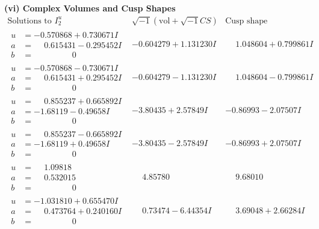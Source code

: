 \documentclass[1p]{elsarticle_modified}
\theoremstyle{definition}
\newcommand{\I}{\sqrt{-1}}
\begin{document}
\newpage\flushleft \textbf{(vi) Complex Volumes and Cusp Shapes}
$$\begin{array}{c|c|c}  
\text{Solutions to }I^u_{2}& \I (\text{vol} + \sqrt{-1}CS) & \text{Cusp shape}\\
 \hline 
\begin{aligned}
u &= -0.570868 + 0.730671 I \\
a &= \phantom{-}0.615431 - 0.295452 I \\
b &= \phantom{-0.000000 } 0\end{aligned}
 & -0.604279 + 1.131230 I & \phantom{-}1.048604 + 0.799861 I \\ \hline\begin{aligned}
u &= -0.570868 - 0.730671 I \\
a &= \phantom{-}0.615431 + 0.295452 I \\
b &= \phantom{-0.000000 } 0\end{aligned}
 & -0.604279 - 1.131230 I & \phantom{-}1.048604 - 0.799861 I \\ \hline\begin{aligned}
u &= \phantom{-}0.855237 + 0.665892 I \\
a &= -1.68119 - 0.49658 I \\
b &= \phantom{-0.000000 } 0\end{aligned}
 & -3.80435 + 2.57849 I & -0.86993 - 2.07507 I \\ \hline\begin{aligned}
u &= \phantom{-}0.855237 - 0.665892 I \\
a &= -1.68119 + 0.49658 I \\
b &= \phantom{-0.000000 } 0\end{aligned}
 & -3.80435 - 2.57849 I & -0.86993 + 2.07507 I \\ \hline\begin{aligned}
u &= \phantom{-}1.09818\phantom{ +0.000000I} \\
a &= \phantom{-}0.532015\phantom{ +0.000000I} \\
b &= \phantom{-0.000000 } 0\end{aligned}
 & \phantom{-}4.85780\phantom{ +0.000000I} & \phantom{-}9.68010\phantom{ +0.000000I} \\ \hline\begin{aligned}
u &= -1.031810 + 0.655470 I \\
a &= \phantom{-}0.473764 + 0.240160 I \\
b &= \phantom{-0.000000 } 0\end{aligned}
 & \phantom{-}0.73474 - 6.44354 I & \phantom{-}3.69048 + 2.66284 I \\ \hline\begin{aligned}

\end{aligned}
\end{array}$$
\end{document}
